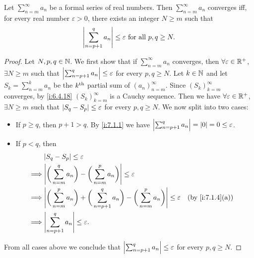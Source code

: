 \setcounter{thm}{4}
\begin{prop}\label{i:7.2.5}
  Let \(\sum_{n = m}^\infty a_n\) be a formal series of real numbers.
  Then \(\sum_{n = m}^\infty a_n\) converges iff, for every real number \(\varepsilon > 0\), there exists an integer \(N \geq m\) such that
  \[
    \left\lvert\sum_{n = p + 1}^q a_n\right\rvert \leq \varepsilon \text{ for all } p, q \geq N.
  \]
\end{prop}

\begin{proof}
  Let \(N, p, q \in \mathbb{N}\).
  We first show that if \(\sum_{n = m}^\infty a_n\) converges, then \(\forall \varepsilon \in \mathbb{R}^+\), \(\exists N \geq m\) such that \(\left\lvert\sum_{n = p + 1}^q a_n\right\rvert \leq \varepsilon\) for every \(p, q \geq N\).
  Let \(k \in \mathbb{N}\) and let \(S_k = \sum_{n = m}^k a_n\) be the \(k^{\operatorname{th}}\) partial sum of \((a_n)_{n = m}^\infty\).
  Since \((S_k)_{k = m}^\infty\) converges, by \cref{i:6.4.18} \((S_k)_{k = m}^\infty\) is a Cauchy sequence.
  Then we have \(\forall \varepsilon \in \mathbb{R}^+\), \(\exists N \geq m\) such that \(\left\lvert S_q - S_p\right\rvert \leq \varepsilon\) for every \(p, q \geq N\).
  We now split into two cases:
  \begin{itemize}
    \item If \(p \geq q\), then \(p + 1 > q\).
          By \cref{i:7.1.1} we have \(\left\lvert\sum_{n = p + 1}^q a_n\right\rvert = \left\lvert0\right\rvert = 0 \leq \varepsilon\).
    \item If \(p < q\), then
          \begin{align*}
                     & \abs{S_q - S_p} \leq \varepsilon                                                                                                                 \\
            \implies & \abs{\bigg(\sum_{n = m}^q a_n\bigg) - \bigg(\sum_{n = m}^p a_n\bigg)} \leq \varepsilon                                                           \\
            \implies & \abs{\bigg(\sum_{n = m}^p a_n\bigg) + \bigg(\sum_{n = p + 1}^q a_n\bigg) - \bigg(\sum_{n = m}^p a_n\bigg)} \leq \varepsilon &  & \by{i:7.1.4}[a] \\
            \implies & \abs{\sum_{n = p + 1}^q a_n} \leq \varepsilon.
          \end{align*}
  \end{itemize}
  From all cases above we conclude that \(\left\lvert\sum_{n = p + 1}^q a_n\right\rvert \leq \varepsilon\) for every \(p, q \geq N\).


\end{proof}
